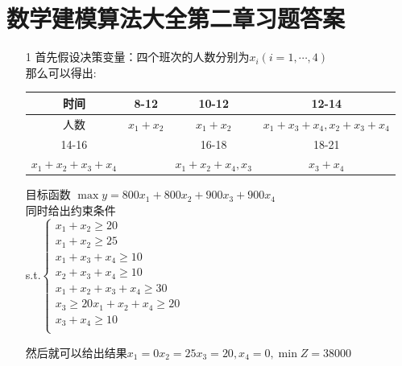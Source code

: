 \documentclass[a4paper,20pt]{article}
\begin{document}
    \section{数学建模算法大全第二章习题答案}
\begin{itemize}
    \item[1]首先假设决策变量：四个班次的人数分别为$x_i(i=1,\cdots,4)$
    \\那么可以得出:\begin{table}[H]
        \begin{tabular}{|c|c|c|c|}
            \hline
            时间 & 8-12 & 10-12 & 12-14 \\ 
            \hline
            人数 & $x_1+x_2$ & $x_1+x_2$ &$x_1+x_3+x_4,x_2+x_3+x_4$ \\
            \hline
            14-16 &  &16-18 &18-21\\
            \hline
            $x_1+x_2+x_3+x_4$ & & $x_1+x_2+x_4,x_3$ & $x_3+x_4$ \\
            \hline
        \end{tabular}
    \end{table}
    \par \noindent  
    
        目标函数 $\max y = 800x_1 + 800x_2+900x_3+900x_4$
        \\同时给出约束条件
        \\s.t.$\left\{\begin{matrix}
            x_1+x_2 \geqslant  20\\
            x_1+x_2 \geqslant  25\\
            x_1+x_3+x_4 \geqslant  10\\
            x_2+x_3+x_4 \geqslant  10\\
            x_1+x_2+x_3+x_4 \geqslant  30\\
            x_3 \geqslant 20
            x_1+x_2+x_4 \geqslant  20\\
            x_3+x_4 \geqslant  10\\
        \end{matrix}\right.$
        
    \par \noindent 然后就可以给出结果$ x_1=0
    x_2=25
    x_3=20
    ,x_4=0,\min Z=38000$
\end{itemize}
\end{document}
